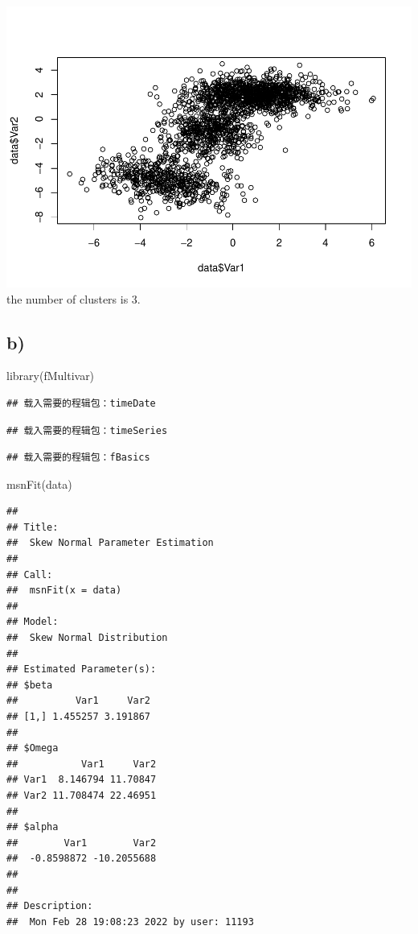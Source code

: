\documentclass[
]{article}
\newenvironment{Shaded}{\begin{snugshade}}{\end{snugshade}}
\newcommand{\FunctionTok}[1]{\textcolor[rgb]{0.00,0.00,0.00}{#1}}
\newcommand{\NormalTok}[1]{#1}
\begin{document}
\includegraphics{539-hw3_files/figure-latex/unnamed-chunk-8-1.pdf} the
number of clusters is 3.

\hypertarget{b-2}{%
\subsection{b)}\label{b-2}}

\begin{Shaded}
\begin{Highlighting}[]
\FunctionTok{library}\NormalTok{(fMultivar)}
\end{Highlighting}
\end{Shaded}

\begin{verbatim}
## 载入需要的程辑包：timeDate
\end{verbatim}

\begin{verbatim}
## 载入需要的程辑包：timeSeries
\end{verbatim}

\begin{verbatim}
## 载入需要的程辑包：fBasics
\end{verbatim}

\begin{Shaded}
\begin{Highlighting}[]
\FunctionTok{msnFit}\NormalTok{(data)}
\end{Highlighting}
\end{Shaded}

\begin{verbatim}
## 
## Title:
##  Skew Normal Parameter Estimation 
## 
## Call:
##  msnFit(x = data)
## 
## Model:
##  Skew Normal Distribution
## 
## Estimated Parameter(s):
## $beta
##          Var1     Var2
## [1,] 1.455257 3.191867
## 
## $Omega
##           Var1     Var2
## Var1  8.146794 11.70847
## Var2 11.708474 22.46951
## 
## $alpha
##        Var1        Var2 
##  -0.8598872 -10.2055688 
## 
## 
## Description:
##  Mon Feb 28 19:08:23 2022 by user: 11193
\end{verbatim}
\end{document}
